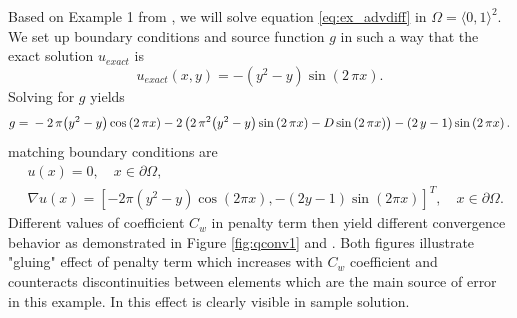\begin{example}
\label{ex:quart1}
Based on Example 1 from \cite{Antonietti2013},
we will solve equation \eqref{eq:ex_advdiff} in $\Omega = \langle 0, 1 \rangle^2$.
We set up boundary conditions and source function $g$ in such a way that 
the exact solution $u_{exact}$ is
\begin{equation}
	u_{exact}(x,y) =  -{\left(y^{2} - y\right)} \sin\left(2 \, \pi x\right).
\end{equation}
Solving for $g$ yields
\begin{equation}
	g = \\
	 -2 \, \pi {\left(y^{2} - y\right)} \cos\left(2 \, \pi x\right) - 2 \, {\left(2 \, 
	 \pi^{2} 
	{\left(y^{2} - y\right)} \sin\left(2 \, \pi x\right) - D\sin\left(2 \, \pi 
	x\right)\right)} 
	 - {\left(2 \, y - 1\right)} \sin\left(2 \, \pi x\right).
\end{equation}
matching  boundary conditions are
\begin{equation}
	\begin{aligned}
	&u(x) = 0, \quad x \in \partial\Omega,\\
	&\nabla u(x) = [-2\pi(y^2 - y)\cos(2 \pi x), -(2 y - 1)\sin(2\pi  x)]^T, \quad x \in 
	\partial\Omega.
	\end{aligned}
\end{equation}
Different values of coefficient $C_w$ in penalty term then yield different 
convergence behavior as demonstrated in Figure \ref{fig:qconv1} and 
. Both figures illustrate "gluing" effect of penalty term 
which increases with $C_w$ coefficient and counteracts discontinuities between elements 
which are the main source of error in this example. In  this effect 
is clearly visible in sample solution.


\end{example}
